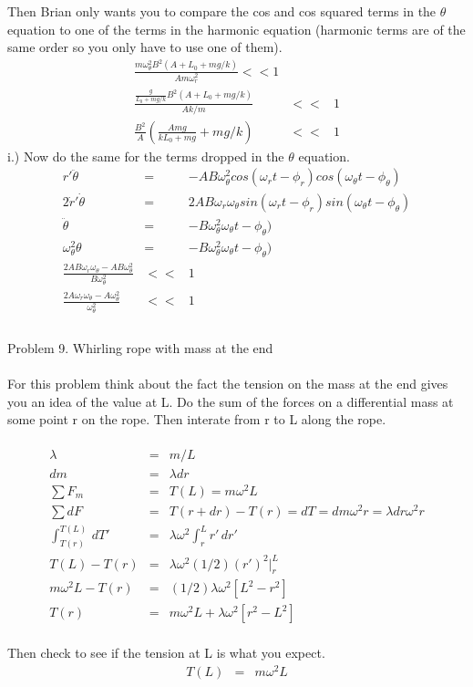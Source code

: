 \documentclass[11pt]{amsart}
\begin{document}
Then Brian only wants you to compare the cos and cos squared terms in the $\theta$ equation to one of the terms in the harmonic equation (harmonic terms are of the same order so you only have to use one of them). \\
\begin{eqnarray*} 
\frac{m\omega_{\theta}^{2}B^{2}(A+L_{0} +mg/k)}{Am\omega_{r}^{2}} << 1 \\
\frac{\frac{g}{L_{0}+mg/k}B^{2}(A+L_{0} +mg/k)}{Ak/m} &<<& 1 \\
\frac{B^{2}}{A}(\frac{Amg}{kL_{0}+mg}+mg/k) &<<& 1 
\end{eqnarray*}
i.) Now do the same for the terms dropped in the $\theta$ equation. \\
\begin{eqnarray*}
r'\ddot{\theta} &=& -AB\omega_{\theta}^{2}cos(\omega_{r}t-\phi_{r})cos(\omega_{\theta}t-\phi_{\theta}) \\
2\dot{r}'\dot{\theta} &=& 2AB\omega_{r}\omega_{\theta}sin(\omega_{r}t-\phi_{r})sin(\omega_{\theta}t-\phi_{\theta}) \\
\ddot{\theta} &=& -B\omega_{\theta}^{2}\omega_{\theta}t-\phi_{\theta}) \\
\omega_{\theta}^{2}\theta &=& -B\omega_{\theta}^{2}\omega_{\theta}t-\phi_{\theta}) \\
\frac{2AB\omega_{r}\omega_{\theta}-AB\omega_{\theta}^{2}}{B\omega_{\theta}^{2}} &<<& 1 \\
\frac{2A\omega_{r}\omega_{\theta}-A\omega_{\theta}^{2}}{\omega_{\theta}^{2}} &<<& 1 \\
\end{eqnarray*} \\
Problem 9. Whirling rope with mass at the end \\ \\
For this problem think about the fact the tension on the mass at the end gives you an idea of the value at L. Do the sum of the forces on a differential mass at some point r on the rope. Then interate from r to L along the rope. \\ \\
\begin{eqnarray*}
\lambda &=& m/L \\
dm &=& \lambda{dr} \\
\sum{F_{m}} &=& T(L) = m\omega^{2}L \\
\sum{dF} &=& T(r+dr)-T(r) =dT =dm\omega^{2}r =\lambda{dr}\omega^{2}r \\
\int_{T(r)}^{T(L)}\,dT' &=& \lambda\omega^{2}\int_{r}^{L}r'\,dr' \\
T(L)-T(r) &=&  \lambda\omega^{2}(1/2)(r')^{2}|_{r}^{L}  \\
m\omega^{2}L -T(r) &=& (1/2)\lambda\omega^{2}[L^{2}-r^{2}] \\
T(r) &=&m\omega^{2}L+\lambda\omega^{2}[r^{2}-L^{2}] 
\end{eqnarray*} \\
Then check to see if the tension at L is what you expect. \\
\begin{eqnarray*}
T(L) &=& m\omega^{2}L 
\end{eqnarray*} \\
\end{document}
